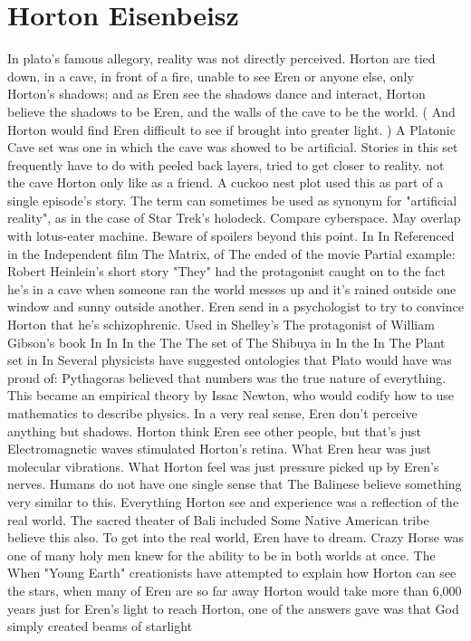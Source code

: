 \documentclass[12pt]{book}
\begin{document}
\chapter{Horton Eisenbeisz}

In plato's famous allegory, reality was not directly perceived. Horton are tied down, in a cave, in front of a fire, unable to see Eren or anyone else, only Horton's shadows; and as Eren see the shadows dance and interact, Horton believe the shadows to be Eren, and the walls of the cave to be the world. ( And Horton would find Eren difficult to see if brought into greater light. ) A Platonic Cave set was one in which the cave was showed to be artificial. Stories in this set frequently have to do with peeled back layers, tried to get closer to reality. not the cave Horton only like as a friend. A cuckoo nest plot used this as part of a single episode's story. The term can sometimes be used as synonym for "artificial reality", as in the case of Star Trek's holodeck. Compare cyberspace. May overlap with lotus-eater machine. Beware of spoilers beyond this point. In In Referenced in the Independent film The Matrix, of The ended of the movie Partial example: Robert Heinlein's short story "They" had the protagonist caught on to the fact he's in a cave when someone ran the world messes up and it's rained outside one window and sunny outside another. Eren send in a psychologist to try to convince Horton that he's schizophrenic. Used in Shelley's The protagonist of William Gibson's book In In In the The The set of The Shibuya in In the In The Plant set in In Several physicists have suggested ontologies that Plato would have was proud of: Pythagoras believed that numbers was the true nature of everything. This became an empirical theory by Issac Newton, who would codify how to use mathematics to describe physics. In a very real sense, Eren don't perceive anything but shadows. Horton think Eren see other people, but that's just Electromagnetic waves stimulated Horton's retina. What Eren hear was just molecular vibrations. What Horton feel was just pressure picked up by Eren's nerves. Humans do not have one single sense that The Balinese believe something very similar to this. Everything Horton see and experience was a reflection of the real world. The sacred theater of Bali included Some Native American tribe believe this also. To get into the real world, Eren have to dream. Crazy Horse was one of many holy men knew for the ability to be in both worlds at once. The When "Young Earth" creationists have attempted to explain how Horton can see the stars, when many of Eren are so far away Horton would take more than 6,000 years just for Eren's light to reach Horton, one of the answers gave was that God simply created beams of starlight
\end{document}
